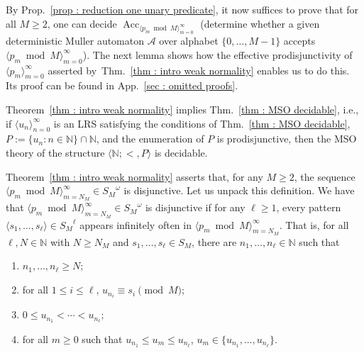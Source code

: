 \documentclass[a4paper,UKenglish,cleveref, autoref, thm-restate]{lipics-v2021}
\newcommand{\nat} {\mathbb{N}}
\newcommand{\Acc} {\operatorname{Acc}}
\begin{document}
By Prop.~\ref{prop : reduction one unary predicate}, it now
suffices to prove that for all $M \ge 2$, one can decide
$\Acc_{\langle p_m\bmod M\rangle_{m=0}^\infty}$ (determine
whether a given deterministic Muller automaton $\mathcal{A}$ over
alphabet $\{0,\dots,M-1\}$ accepts
$\langle p_m\bmod M\rangle_{m=0}^\infty$).  The next lemma
shows how the effective prodisjunctivity of
$\langle p_m \rangle_{m=0}^\infty$ asserted by~Thm.~\ref{thm : intro weak normality} enables us to do this.
Its proof can be found in App.~\ref{sec : omitted proofs}.

\begin{lemma}\label{lem : Theorems intro implications}
    Theorem~\ref{thm : intro weak normality} implies Thm.~\ref{thm : MSO decidable}, i.e., if $\langle u_n\rangle_{n=0}^\infty$ is an LRS satisfying the conditions of Thm.~\ref{thm : MSO decidable}, $P := \{u_n \colon n\in\nat\}\cap\nat$, and the enumeration of $P$ is prodisjunctive, then the MSO theory of the structure $\langle \nat ; < , P\rangle$ is decidable.
\end{lemma}


Theorem~\ref{thm : intro weak normality} asserts that, for any
$M \geq 2$, the sequence
$\langle p_m\bmod M\rangle_{m=N_M}^\infty \in {S_M}^\omega$
is disjunctive.  Let us unpack this definition.
We have that $\langle p_m\bmod M\rangle_{m=N_M}^\infty \in {S_M}^\omega$ is
disjunctive if for any $\ell \ge 1$, every pattern
$\langle s_1,\dots,s_\ell\rangle \in {S_M}^\ell$ appears infinitely often in
$\langle p_m\bmod M\rangle_{m=N_M}^\infty$.  That is, for
all $\ell, N \in \nat$ with $N \geq N_M$ and
$s_1,\dots,s_\ell \in S_M$, there are $n_1,\dots,n_\ell \in \nat$ such
that
\begin{enumerate}
    \item $n_1,\dots,n_\ell \ge N$;
    \item for all $1 \le i \le \ell$, $u_{n_i} \equiv s_i \pmod M$;
    \item $0 \le u_{n_1} < \cdots < u_{n_\ell}$;
    \item for all $m \ge 0$ such that $u_{n_1} \le u_m \le u_{n_\ell}$, $u_m \in \{u_{n_1},\dots,u_{n_\ell}\}$. 
\end{enumerate}
\end{document}
